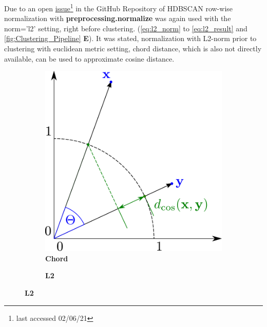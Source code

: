 Due to an open \href{https://github.com/scikit-learn-contrib/hdbscan/issues/69}{issue}\footnote{last accessed 02/06/21} in the GitHub Repository of \gls{HDBSCAN} row-wise normalization with \textbf{preprocessing.normalize} was again used with the \colorbox{backcolour}{norm='l2'} setting, right before clustering. (\autoref{eq:l2_norm} to \autoref{eq:l2_result} and \autoref{fig:Clustering_Pipeline} \textsf{\textbf{E}}). It was stated, normalization with L2-norm prior to clustering with euclidean metric setting, chord distance, which is also not directly available, can be used to approximate cosine distance.

\begin{figure}[!hbt]
    \centering
    \begin{subfigure}[b]{0.475\textwidth}
        \caption[Chord]{\textbf{Chord}}
        \label{subfig:Euclidean}
        \includegraphics[width=\textwidth]{Graphics/Chord.pdf}
    \end{subfigure}
    \hfill
    \begin{subfigure}[b]{0.475\textwidth}
        \caption[L2]{\textbf{L2}}
        \label{subfig:Cosinus}            

\end{subfigure}
\end{figure}
